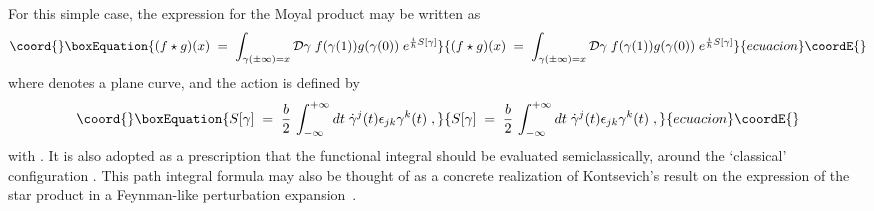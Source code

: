 \documentclass[a4paper,12pt]{article}
\begin{document}
For this simple case, the expression for the Moyal product may be
written as
\begin{equation}\coord{}\boxEquation{
   \label{eq:frep}
(f \star g)(x)\;=\; \int_{\gamma(\pm \infty)=x} {\mathcal D}\gamma
\; f(\gamma(1)) g(\gamma(0)) \; e^{\frac{i}{\hbar}S[\gamma]} 
}{
   (f \star g)(x)\;=\; \int_{\gamma(\pm \infty)=x} {\mathcal D}\gamma
\; f(\gamma(1)) g(\gamma(0)) \; e^{\frac{i}{\hbar}S[\gamma]} 
}{ecuacion}\coordE{}\end{equation}
where \coordHE{} denotes a plane curve,
and the
action \coordHE{} is defined by
\begin{equation}\coord{}\boxEquation{
  \label{eq:frep1}
S[\gamma]\;=\; \frac{b}{2} \, \int_{-\infty}^{+\infty} dt \; {\dot
\gamma}^j(t) \epsilon_{jk} \gamma^k(t) \;, 
}{
  S[\gamma]\;=\; \frac{b}{2} \, \int_{-\infty}^{+\infty} dt \; {\dot
\gamma}^j(t) \epsilon_{jk} \gamma^k(t) \;, 
}{ecuacion}\coordE{}\end{equation}
with \coordHE{}. It is also adopted as a prescription
that the
functional integral should be evaluated semiclassically, around the
`classical' configuration \mbox{\coordHE{}}.
This path integral formula may also be thought of as a concrete
realization of Kontsevich's result on the expression of the star
product in a Feynman-like perturbation expansion~\cite{kontsevich}.
\end{document}
